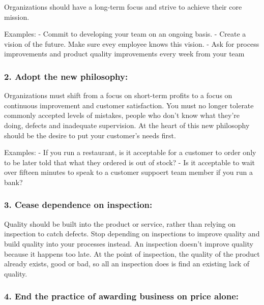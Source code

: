 \documentclass[11pt]{article}
\begin{document}
Organizations should have a long-term focus and strive to achieve their
core mission.

Examples: - Commit to developing your team on an ongoing basis. - Create
a vision of the future. Make sure evey employee knows this vision. - Ask
for process improvements and product quality improvements every week
from your team

\hypertarget{adopt-the-new-philosophy}{%
\subsubsection{2. Adopt the new
philosophy:}\label{adopt-the-new-philosophy}}

Organizations must shift from a focus on short-term profits to a focus
on continuous improvement and customer satisfaction. You must no longer
tolerate commonly accepted levels of mistakes, people who don't know
what they're doing, defects and inadequate supervision. At the heart of
this new philosophy should be the desire to put your customer's needs
first.

Examples: - If you run a restaurant, is it acceptable for a customer to
order only to be later told that what they ordered is out of stock? - Is
it acceptable to wait over fifteen minutes to speak to a customer
suppoert team member if you run a bank?

\hypertarget{cease-dependence-on-inspection}{%
\subsubsection{3. Cease dependence on
inspection:}\label{cease-dependence-on-inspection}}

Quality should be built into the product or service, rather than relying
on inspection to catch defects. Stop depending on inspections to improve
quality and build quality into your processes instead. An inspection
doesn't improve quality because it happens too late. At the point of
inspection, the quality of the product already exists, good or bad, so
all an inspection does is find an existing lack of quality.

\hypertarget{end-the-practice-of-awarding-business-on-price-alone}{%
\subsubsection{4. End the practice of awarding business on price
alone:}\label{end-the-practice-of-awarding-business-on-price-alone}}
\end{document}
